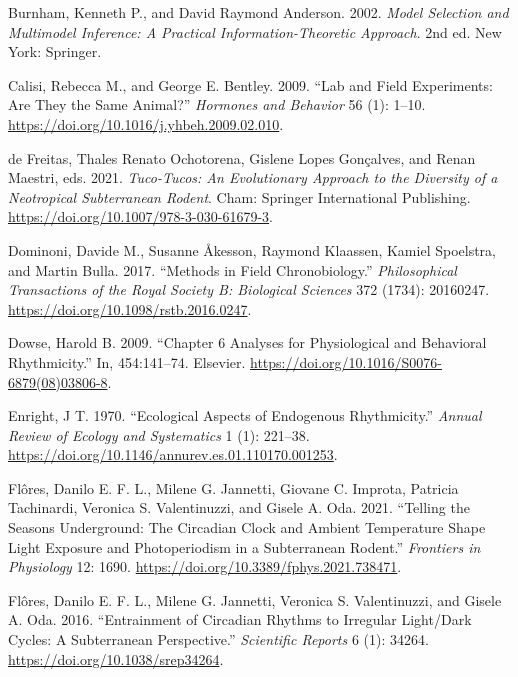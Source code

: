 \documentclass[msc,numbers,hidelinks]{coppe}
\newlength{\cslhangindent}
\newenvironment{CSLReferences}[2] %
 {%
  \setlength{\parindent}{0pt}
  \ifodd #1 \everypar{\setlength{\hangindent}{\cslhangindent}}\ignorespaces\fi
  \ifnum #2 > 0
  \setlength{\parskip}{#2\baselineskip}
  \fi
 }%
 {}
\begin{document}
\begin{CSLReferences}{1}{0}
  \leavevmode{}%
  Burnham, Kenneth P., and David Raymond Anderson. 2002. \emph{Model Selection and Multimodel Inference: A Practical Information-Theoretic Approach}. 2nd ed. {New York}: {Springer}.

  \leavevmode{}%
  Calisi, Rebecca M., and George E. Bentley. 2009. {``Lab and Field Experiments: {Are} They the Same Animal?''} \emph{Hormones and Behavior} 56 (1): 1--10. \url{https://doi.org/10.1016/j.yhbeh.2009.02.010}.

  \leavevmode{}%
  de Freitas, Thales Renato Ochotorena, Gislene Lopes Gonçalves, and Renan Maestri, eds. 2021. \emph{Tuco-{Tucos}: {An Evolutionary Approach} to the {Diversity} of a {Neotropical Subterranean Rodent}}. {Cham}: {Springer International Publishing}. \url{https://doi.org/10.1007/978-3-030-61679-3}.

  \leavevmode{}%
  Dominoni, Davide M., Susanne Åkesson, Raymond Klaassen, Kamiel Spoelstra, and Martin Bulla. 2017. {``Methods in Field Chronobiology.''} \emph{Philosophical Transactions of the Royal Society B: Biological Sciences} 372 (1734): 20160247. \url{https://doi.org/10.1098/rstb.2016.0247}.

  \leavevmode{}%
  Dowse, Harold B. 2009. {``Chapter 6 Analyses for Physiological and Behavioral Rhythmicity.''} In, 454:141--74. Elsevier. \url{https://doi.org/10.1016/S0076-6879(08)03806-8}.

  \leavevmode{}%
  Enright, J T. 1970. {``Ecological {Aspects} of {Endogenous Rhythmicity}.''} \emph{Annual Review of Ecology and Systematics} 1 (1): 221--38. \url{https://doi.org/10.1146/annurev.es.01.110170.001253}.

  \leavevmode{}%
  Flôres, Danilo E. F. L., Milene G. Jannetti, Giovane C. Improta, Patricia Tachinardi, Veronica S. Valentinuzzi, and Gisele A. Oda. 2021. {``Telling the {Seasons Underground}: {The Circadian Clock} and {Ambient Temperature Shape Light Exposure} and {Photoperiodism} in a {Subterranean Rodent}.''} \emph{Frontiers in Physiology} 12: 1690. \url{https://doi.org/10.3389/fphys.2021.738471}.

  \leavevmode{}%
  Flôres, Danilo E. F. L., Milene G. Jannetti, Veronica S. Valentinuzzi, and Gisele A. Oda. 2016. {``Entrainment of Circadian Rhythms to Irregular Light/Dark Cycles: A Subterranean Perspective.''} \emph{Scientific Reports} 6 (1): 34264. \url{https://doi.org/10.1038/srep34264}.


\end{CSLReferences}
\end{document}
